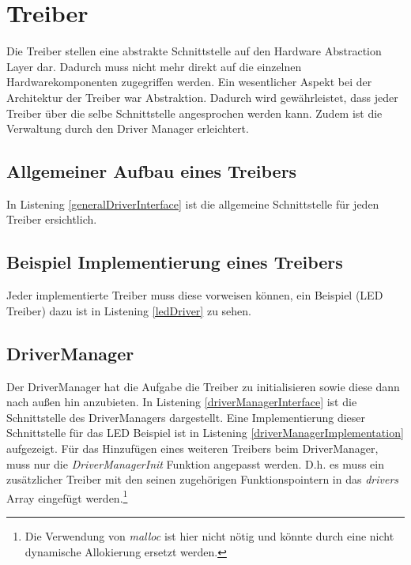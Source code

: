 \section{Treiber}
Die Treiber stellen eine abstrakte Schnittstelle auf den Hardware Abstraction Layer dar. Dadurch muss nicht mehr direkt auf die einzelnen Hardwarekomponenten zugegriffen werden. Ein wesentlicher Aspekt bei der Architektur der Treiber war Abstraktion. Dadurch wird gewährleistet, dass jeder Treiber über die selbe Schnittstelle angesprochen werden kann. Zudem ist die Verwaltung durch den Driver Manager erleichtert.

\subsection{Allgemeiner Aufbau eines Treibers}
In Listening \ref{generalDriverInterface} ist die allgemeine Schnittstelle für jeden Treiber ersichtlich. 



\subsection{Beispiel Implementierung eines Treibers}
Jeder implementierte Treiber muss diese vorweisen können, ein Beispiel (LED Treiber) dazu ist in Listening \ref{ledDriver} zu sehen.



\subsection{DriverManager}
Der DriverManager hat die Aufgabe die Treiber zu initialisieren sowie diese dann nach außen hin anzubieten. In Listening \ref{driverManagerInterface} ist die Schnittstelle des DriverManagers dargestellt. Eine Implementierung dieser Schnittstelle für das LED Beispiel ist in Listening \ref{driverManagerImplementation} aufgezeigt. Für das Hinzufügen eines weiteren Treibers beim DriverManager, muss nur die \textit{DriverManagerInit} Funktion angepasst werden. D.h. es muss ein zusätzlicher Treiber mit den seinen zugehörigen Funktionspointern in das \textit{drivers} Array eingefügt werden.\footnote{Die Verwendung von \textit{malloc} ist hier nicht nötig und könnte durch eine nicht dynamische Allokierung ersetzt werden.}





\pagebreak 